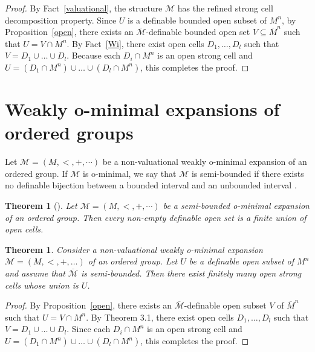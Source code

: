 \documentclass{amsart}
\theoremstyle{definition}
\theoremstyle{plain}
\newtheorem{theorem}[definition]{Theorem}
\def \M {{\mathcal M}}
\begin{document}
\begin{proof}
By Fact~\ref{valuational}, the structure $\mathcal M$ has the refined strong cell decomposition property.
Since $U$ is a definable bounded open subset of $M^n$, by Proposition~\ref{open},
there exists an $\overline{\M}$-definable bounded open set $V \subseteq \overline{M}^n$ such that
$U = V \cap M^n$.
By Fact~\ref{Wi}, there exist open cells $D_1, \dots, D_l$ such that
$V = D_1 \cup \dots \cup D_l$.
Because each $D_i \cap M^n$ is an open strong cell and ${U} = (D_1 \cap M^n) \cup \dots \cup (D_l \cap M^n)$,
this completes the proof.
\end{proof}




\section{Weakly o-minimal expansions of ordered groups}


Let $\mathcal M = (M, <, +, \cdots)$ be a non-valuational weakly o-minimal expansion of an ordered group.
If $\M$ is o-minimal, we say that $\mathcal M$ is semi-bounded if
there exists no definable bijection between a bounded interval and an unbounded interval \cite{E}.
 

\begin{theorem}[\cite{EEP}]
Let $\mathcal M = (M, <, +, \cdots)$ be a semi-bounded o-minimal expansion of an ordered group.
Then every non-empty definable open set is a finite union of open cells.
\end{theorem}




\begin{theorem}
Consider a non-valuational weakly o-minimal expansion $\mathcal{M}=(M, <, +, \dots)$ of an ordered group.
Let $U$ be a definable open subset of $M^n$ and assume that $\overline{\M}$ is semi-bounded.
Then there exist finitely many open strong cells whose union is $U$.
\end{theorem}


\begin{proof}
By Proposition~\ref{open}, there exists an $\overline{\M}$-definable open subset $V$ of $\overline{M}^n$ such that 
$U=V \cap M^n$.
By Theorem 3.1, there exist open cells $D_1, \dots, D_l$ such that
$V= D_1 \cup \dots \cup D_l$.
Since each $D_i \cap M^n$ is an open strong cell and ${U} = (D_1 \cap M^n) \cup \dots \cup (D_l \cap M^n)$,
this completes the proof.
\end{proof}
\end{document}
